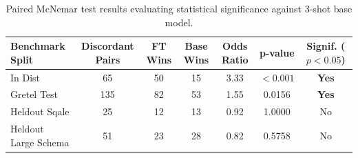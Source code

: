 \begin{table}[t]
\centering\small
\begin{tabular}{lcccccc}
\toprule
\textbf{Benchmark Split} & \textbf{Discordant Pairs} & \textbf{FT Wins} & \textbf{Base Wins} & \textbf{Odds Ratio} & \textbf{p-value} & \textbf{Signif. ($p < 0.05$)} \\
\midrule
In Dist & 65 & 50 & 15 & 3.33 & $< 0.001$ & \textbf{Yes} \\
Gretel Test & 135 & 82 & 53 & 1.55 & 0.0156 & \textbf{Yes} \\
Heldout Sqale & 25 & 12 & 13 & 0.92 & 1.0000 & No \\
Heldout Large Schema & 51 & 23 & 28 & 0.82 & 0.5758 & No \\
\bottomrule
\end{tabular}
\caption{Paired McNemar test results evaluating statistical significance against 3-shot base model.}
\label{tab:significance}
\end{table}
